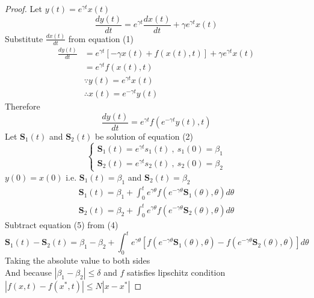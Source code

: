 \begin{proof}[\textcolor{theme}{Proof}]
    Let $ y(t) = e^{\gamma t} x(t) $
    \[
        \frac{dy(t)}{dt}  = e^{\gamma t}\frac{dx(t)}{dt} + \gamma e^{\gamma t}x(t)
    \]
    Substitute $\displaystyle \frac{dx(t)}{dt}$ from equation (1)
    \begin{align*}
        \frac{dy(t)}{dt} & = e^{\gamma t}\left[-\gamma x(t) + f(x(t),t)\right] + \gamma e^{\gamma t}x(t)
        \\
                         & = e^{\gamma t}f(x(t),t)
        \\
                         & \because y(t) = e^{\gamma t} x(t)
        \\
                         & \therefore x(t) = e^{-\gamma t}y(t)
    \end{align*}
    Therefore
    \begin{equation}
        \frac{dy(t)}{dt} = e^{\gamma t}f(e^{-\gamma t}y(t),t)
    \end{equation}
    Let $\mathbf{S}_1(t)$ and $\mathbf{S}_2(t)$ be solution of equation (2)
    \begin{equation}
        \begin{cases}
            \displaystyle \mathbf{S}_1(t) = e^{\gamma t}s_1(t) \ , \  s_1(0) = \beta_1
            \\
            \displaystyle \mathbf{S}_2(t) = e^{\gamma t}s_2(t) \ , \  s_2(0) = \beta_2
        \end{cases}
    \end{equation}
    $y(0) = x(0)$ i.e. $\mathbf{S}_1(t) = \beta_1 $ and $\mathbf{S}_2(t) = \beta_2$
    \begin{align}
        \mathbf{S}_1(t) = \beta_1 + \int_{0}^{t}e^{\gamma \theta}f(e^{-\gamma \theta}\mathbf{S}_1(\theta),\theta)d\theta
        \\
        \mathbf{S}_2(t) = \beta_2 + \int_{0}^{t}e^{\gamma \theta}f(e^{-\gamma \theta}\mathbf{S}_2(\theta),\theta)d\theta
    \end{align}
    Subtract equation (5) from (4)
    \[
        \mathbf{S}_1(t) - \mathbf{S}_2(t) = \beta_1 - \beta_2 + \int_{0}^{t} e^{\gamma \theta}\left[ f(e^{-\gamma \theta}\mathbf{S}_1(\theta),\theta) - f(e^{-\gamma \theta}\mathbf{S}_2(\theta),\theta)\right]d\theta
    \]
    Taking the absolute value to both sides
    \\
    And because $\left\lvert \beta_1 - \beta_2 \right\rvert \leq \delta $
    and $f$ satisfies lipschitz condition $\left\lvert f(x,t) - f(x^*,t)\right\rvert \leq N\left\lvert x - x^*\right\rvert$

\end{proof}

